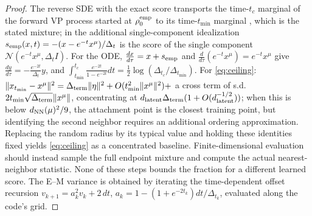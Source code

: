 \begin{proof}
The reverse SDE with the exact score transports the time-$t_c$ marginal of the forward VP process started at $\rho^{\rm emp}_0$ to its time-$t_{\min}$ marginal \citep{song2021scoresde}, which is the stated mixture; in the additional single-component idealization $s_{\rm emp}(x,t)=-(x-e^{-t}x^\mu)/\Delta_t$ is the score of the single component $\mathcal N(e^{-t}x^\mu,\Delta_tI)$. For the ODE, $\frac{dx}{d\tau}=x+s_{\rm emp}$ and $\frac{d}{d\tau}(e^{-t}x^\mu)=e^{-t}x^\mu$ give $\frac{dy}{d\tau}=-\frac{e^{-2t}}{\Delta_t}y$, and $\int_{t_{\min}}^{t_c}\frac{e^{-2t}}{1-e^{-2t}}dt=\tfrac12\log(\Delta_{t_c}/\Delta_{t_{\min}})$. For \eqref{eq:ceiling}: $\|x_{t_{\min}}-x^\mu\|^2=\Delta_{\rm term}\|\eta\|^2+O(t_{\min}^2\|x^\mu\|^2)+$ a cross term of s.d.\ $2t_{\min}\sqrt{\Delta_{\rm term}}\|x^\mu\|$, concentrating at $d_{\mathrm{latent}}\Delta_{\rm term}(1+O(d_{\mathrm{latent}}^{-1/2}))$; when this is below $d_{\rm NN}(\mu)^2/9$, the attachment point is the closest training point, but identifying the second neighbor requires an additional ordering approximation. Replacing the random radius by its typical value and holding these identities fixed yields \eqref{eq:ceiling} as a concentrated baseline. Finite-dimensional evaluation should instead sample the full endpoint mixture and compute the actual nearest-neighbor statistic. None of these steps bounds the fraction for a different learned score. The E--M variance is obtained by iterating the time-dependent offset recursion $v_{k+1}=a_k^2v_k+2\,dt$, $a_k=1-(1+e^{-2t_k})dt/\Delta_{t_k}$, evaluated along the code's grid.
\end{proof}

